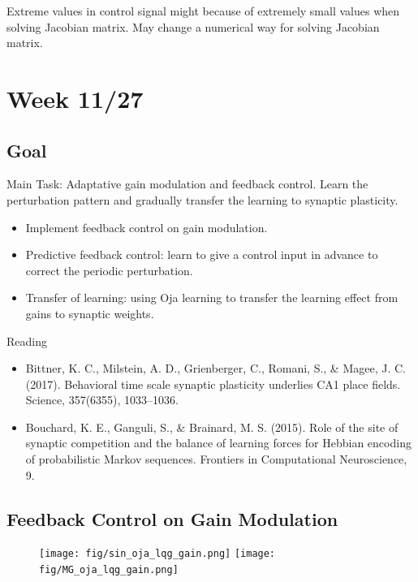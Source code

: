 \documentclass[12pt, a4paper]{article}
\begin{document}
Extreme values in control signal might because of extremely small values when solving Jacobian matrix. May change a numerical way for solving Jacobian matrix.

\newpage


\section*{Week 11/27}

\subsection*{Goal}

\noindent
Main Task: Adaptative gain modulation and feedback control. Learn the perturbation pattern and gradually transfer the learning to synaptic plasticity.

\begin{itemize}
    \item Implement feedback control on gain modulation.
    \item Predictive feedback control: learn to give a control input in advance to correct the periodic perturbation.
    \item Transfer of learning: using Oja learning to transfer the learning effect from gains to synaptic weights.
\end{itemize}

\noindent
Reading

\begin{itemize}
    \item Bittner, K. C., Milstein, A. D., Grienberger, C., Romani, S., \& Magee, J. C. (2017). Behavioral time scale synaptic plasticity underlies CA1 place fields. Science, 357(6355), 1033–1036.
    \item Bouchard, K. E., Ganguli, S., \& Brainard, M. S. (2015). Role of the site of synaptic competition and the balance of learning forces for Hebbian encoding of probabilistic Markov sequences. Frontiers in Computational Neuroscience, 9.
\end{itemize}

\newpage

\subsection*{Feedback Control on Gain Modulation}

\begin{figure}[H]
    \centering
    \texttt{[image: fig/sin\_oja\_lqg\_gain.png]}
    \texttt{[image: fig/MG\_oja\_lqg\_gain.png]}
    \label{fig:1}
\end{figure}
\end{document}
